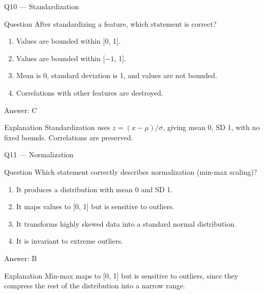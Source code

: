 \documentclass[aspectratio=169,8pt]{beamer}
\begin{document}
	\begin{frame}{Q10 --- Standardization}
		\begin{block}{Question}
			After standardizing a feature, which statement is correct?
		\end{block}
		\begin{enumerate}
			\item Values are bounded within [0, 1].
			\item Values are bounded within [$-1$, 1].
			\item Mean is 0, standard deviation is 1, and values are not bounded.
			\item Correlations with other features are destroyed.
		\end{enumerate}
		\begin{exampleblock}{Answer: C}\end{exampleblock}
		\begin{block}{Explanation}
			Standardization uses $z=(x-\mu)/\sigma$, giving mean 0, SD 1, with no fixed bounds. Correlations are preserved.
		\end{block}
	\end{frame}
	
	\begin{frame}{Q11 --- Normalization}
		\begin{block}{Question}
			Which statement correctly describes normalization (min-max scaling)?
		\end{block}
		\begin{enumerate}
			\item It produces a distribution with mean 0 and SD 1.
			\item It maps values to [0, 1] but is sensitive to outliers.
			\item It transforms highly skewed data into a standard normal distribution.
			\item It is invariant to extreme outliers.
		\end{enumerate}
		\begin{exampleblock}{Answer: B}\end{exampleblock}
		\begin{block}{Explanation}
			Min-max maps to [0, 1] but is sensitive to outliers, since they compress the rest of the distribution into a narrow range.
		\end{block}
	\end{frame}
	
\end{document}
